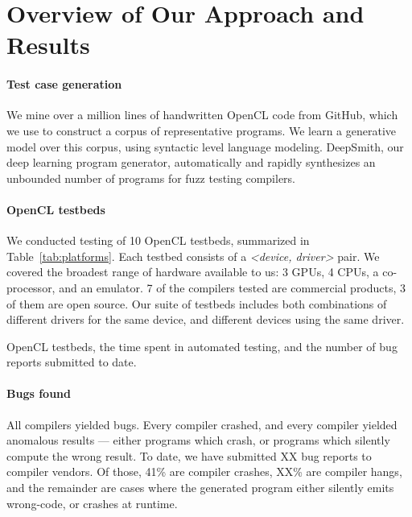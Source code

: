 \section{Overview of Our Approach and Results}\label{sec:overview}

\paragraph{Test case generation} We mine over a million lines of handwritten OpenCL code from GitHub, which we use to construct a corpus of representative programs. We learn a generative model over this corpus, using syntactic level language modeling. DeepSmith, our deep learning program generator, automatically and rapidly synthesizes an unbounded number of programs for fuzz testing compilers.

\paragraph{OpenCL testbeds} We conducted testing of 10 OpenCL testbeds, summarized in Table~\ref{tab:platforms}. Each testbed consists of a \emph{<device, driver>} pair. We covered the broadest range of hardware available to us: 3 GPUs, 4 CPUs, a co-processor, and an emulator. 7 of the compilers tested are commercial products, 3 of them are open source. Our suite of testbeds includes both combinations of different drivers for the same device, and different devices using the same driver.


\begin{table*}[t!]
	\scriptsize %
	\centering %
	
	\caption{OpenCL testbeds, the time spent in automated testing, and the number of bug reports submitted to date.}
	\label{tab:platforms}
\end{table*}


\paragraph{Bugs found} All compilers yielded bugs. Every compiler crashed, and every compiler yielded anomalous results --- either programs which crash, or programs which silently compute the wrong result. To date, we have submitted XX bug reports to compiler vendors. Of those, 41\% are compiler crashes, XX\% are compiler hangs, and the remainder are cases where the generated program either silently emits wrong-code, or crashes at runtime. 